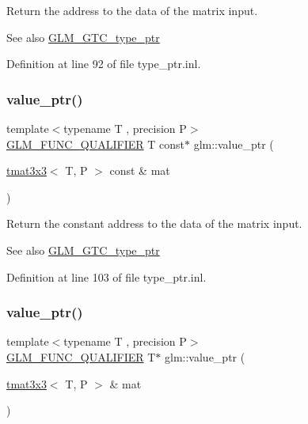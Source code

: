 Return the address to the data of the matrix input. \begin{DoxySeeAlso}{See also}
\mbox{\hyperlink{group__gtc__type__ptr}{G\+L\+M\+\_\+\+G\+T\+C\+\_\+type\+\_\+ptr}} 
\end{DoxySeeAlso}


Definition at line 92 of file type\+\_\+ptr.\+inl.

\mbox{\label{group__gtc__type__ptr_ga0fd20ac385befba86cf2bbf836728bc2}} 
\subsubsection{\texorpdfstring{value\_ptr()}{value\_ptr()}\hspace{0.1cm}{\footnotesize\ttfamily [10/27]}}
{\footnotesize\ttfamily template$<$typename T , precision P$>$ \\
\mbox{\hyperlink{setup_8hpp_a33fdea6f91c5f834105f7415e2a64407}{G\+L\+M\+\_\+\+F\+U\+N\+C\+\_\+\+Q\+U\+A\+L\+I\+F\+I\+ER}} T const$\ast$ glm\+::value\+\_\+ptr (\begin{DoxyParamCaption}\item[{\mbox{\hyperlink{structglm_1_1tmat3x3}{tmat3x3}}$<$ T, P $>$ const \&}]{mat }\end{DoxyParamCaption})}

Return the constant address to the data of the matrix input. \begin{DoxySeeAlso}{See also}
\mbox{\hyperlink{group__gtc__type__ptr}{G\+L\+M\+\_\+\+G\+T\+C\+\_\+type\+\_\+ptr}} 
\end{DoxySeeAlso}


Definition at line 103 of file type\+\_\+ptr.\+inl.

\mbox{\label{group__gtc__type__ptr_ga4470e16d0e844cb2c4f7b2e731824f87}} 
\subsubsection{\texorpdfstring{value\_ptr()}{value\_ptr()}\hspace{0.1cm}{\footnotesize\ttfamily [11/27]}}
{\footnotesize\ttfamily template$<$typename T , precision P$>$ \\
\mbox{\hyperlink{setup_8hpp_a33fdea6f91c5f834105f7415e2a64407}{G\+L\+M\+\_\+\+F\+U\+N\+C\+\_\+\+Q\+U\+A\+L\+I\+F\+I\+ER}} T$\ast$ glm\+::value\+\_\+ptr (\begin{DoxyParamCaption}\item[{\mbox{\hyperlink{structglm_1_1tmat3x3}{tmat3x3}}$<$ T, P $>$ \&}]{mat }\end{DoxyParamCaption})}

